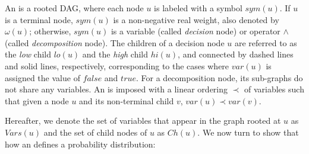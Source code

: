 \begin{definition}\label{ADDAND-definition}
An \ADDAND is a rooted DAG, where each node $u$ is labeled with a symbol $sym(u)$.
If $u$ is a terminal node, $sym(u)$ is a non-negative real weight, also denoted by $\omega(u)$; otherwise, $sym(u)$ is a variable (called \emph{decision} node) or operator $\wedge$ (called \emph{decomposition} node). 
The children of a decision node $u$ are referred to as the \emph{low} child $lo(u)$ and the \emph{high} child $hi(u)$, and connected by dashed lines and solid lines, respectively, corresponding to the cases where $\mathit{var}(u)$ is assigned the value of $\mathit{false}$ and  $\mathit{true}$. 
For a decomposition node, its sub-graphs do not share any variables.
An \ADDAND is imposed with a linear ordering $\prec$ of variables such that given a node $u$ and its non-terminal child $v$, $\mathit{var}(u) \prec \mathit{var}(v) $.


\end{definition}

Hereafter, we denote the set of variables that appear in the graph rooted at $u$ as $\mathit{Vars}(u)$ and the set of child nodes of $u$ as $Ch(u)$.
We now turn to show that how an \ADDAND defines a probability distribution:
 
